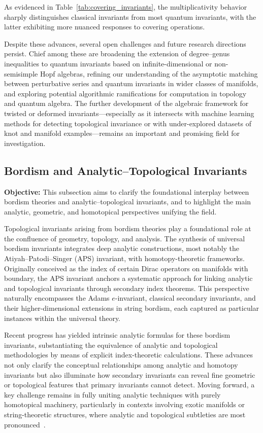 \documentclass[sigconf]{acmart}
\begin{document}
As evidenced in Table~\ref{tab:covering_invariants}, the multiplicativity behavior sharply distinguishes classical invariants from most quantum invariants, with the latter exhibiting more nuanced responses to covering operations.

Despite these advances, several open challenges and future research directions persist. Chief among these are broadening the extension of degree–genus inequalities to quantum invariants based on infinite-dimensional or non-semisimple Hopf algebras, refining our understanding of the asymptotic matching between perturbative series and quantum invariants in wider classes of manifolds, and exploring potential algorithmic ramifications for computation in topology and quantum algebra. The further development of the algebraic framework for twisted or deformed invariants—especially as it intersects with machine learning methods for detecting topological invariance or with under-explored datasets of knot and manifold examples—remains an important and promising field for investigation.

\subsection{Bordism and Analytic–Topological Invariants}

\textbf{Objective:} This subsection aims to clarify the foundational interplay between bordism theories and analytic–topological invariants, and to highlight the main analytic, geometric, and homotopical perspectives unifying the field.

Topological invariants arising from bordism theories play a foundational role at the confluence of geometry, topology, and analysis. The synthesis of universal bordism invariants integrates deep analytic constructions, most notably the Atiyah–Patodi–Singer (APS) invariant, with homotopy-theoretic frameworks. Originally conceived as the index of certain Dirac operators on manifolds with boundary, the APS invariant anchors a systematic approach for linking analytic and topological invariants through secondary index theorems. This perspective naturally encompasses the Adams $e$-invariant, classical secondary invariants, and their higher-dimensional extensions in string bordism, each captured as particular instances within the universal theory.

Recent progress has yielded intrinsic analytic formulas for these bordism invariants, substantiating the equivalence of analytic and topological methodologies by means of explicit index-theoretic calculations. These advances not only clarify the conceptual relationships among analytic and homotopy invariants but also illuminate how secondary invariants can reveal fine geometric or topological features that primary invariants cannot detect. Moving forward, a key challenge remains in fully uniting analytic techniques with purely homotopical machinery, particularly in contexts involving exotic manifolds or string-theoretic structures, where analytic and topological subtleties are most pronounced~\cite{ref82}.
\end{document}
